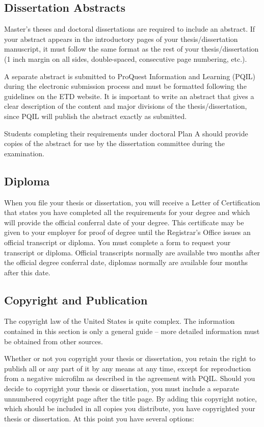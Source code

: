\subsection{Dissertation Abstracts}
%
Master’s theses and doctoral dissertations are required to include an abstract. If your abstract appears in the introductory pages of your thesis/dissertation manuscript, it must follow the same format as the rest of your thesis/dissertation (1 inch margin on all sides, double-spaced, consecutive page numbering, etc.).

A separate abstract is submitted to ProQuest Information and Learning (PQIL) during the electronic submission process and must be formatted following the guidelines on the ETD website. It is important to write an abstract that gives a clear description of the content and major divisions of the thesis/dissertation, since PQIL will publish the abstract exactly as submitted.

Students completing their requirements under doctoral Plan A should provide copies of the abstract for use by the dissertation committee during the examination.

\subsection{Diploma}
%
When you file your thesis or dissertation, you will receive a Letter of Certification that states you have completed all the requirements for your degree and which will provide the official conferral date of your degree. This certificate may be given to your employer for proof of degree until the Registrar's Office issues an official transcript or diploma. You must complete a form to request your transcript or diploma. Official transcripts normally are available two months after the official degree conferral date, diplomas normally are available four months after this date.

\subsection{Copyright and Publication}
%
The copyright law of the United States is quite complex. The information contained in this section is only a general guide – more detailed information must be obtained from other sources.

Whether or not you copyright your thesis or dissertation, you retain the right to publish all or any part of it by any means at any time, except for reproduction from a negative microfilm as described in the agreement with PQIL. Should you decide to copyright your thesis or dissertation, you must include a separate unnumbered copyright page after the title page. By adding this copyright notice, which should be included in all copies you distribute, you have copyrighted your thesis or dissertation. At this point you have several options:

